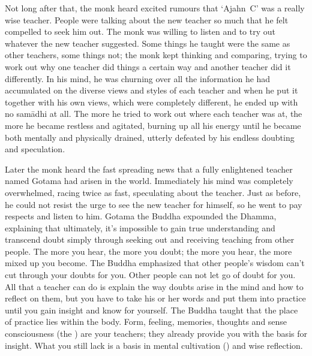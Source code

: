 Not long after that, the monk heard excited rumours that `Ajahn~C' was a really wise teacher. People were talking about the new teacher so much that he felt compelled to seek him out. The monk was willing to listen and to try out whatever the new teacher suggested. Some things he taught were the same as other teachers, some things not; the monk kept thinking and comparing, trying to work out why one teacher did things a certain way and another teacher did it differently. In his mind, he was churning over all the information he had accumulated on the diverse views and styles of each teacher and when he put it together with his own views, which were completely different, he ended up with no sam\=adhi at all. The more he tried to work out where each teacher was at, the more he became restless and agitated, burning up all his energy until he became both mentally and physically drained, utterly defeated by his endless doubting and speculation. 

Later the monk heard the fast spreading news that a fully enlightened teacher named Gotama had arisen in the world. Immediately his mind was completely overwhelmed, racing twice as fast, speculating about the teacher. Just as before, he could not resist the urge to see the new teacher for himself, so he went to pay respects and listen to him. Gotama the Buddha expounded the Dhamma, explaining that ultimately, it's impossible to gain true understanding and transcend doubt simply through seeking out and receiving teaching from other people. The more you hear, the more you doubt; the more you hear, the more mixed up you become. The Buddha emphasized that other people's wisdom can't cut through your doubts for you. Other people can not let go of doubt for you. All that a teacher can do is explain the way doubts arise in the mind and how to reflect on them, but you have to take his or her words and put them into practice until you gain insight and know for yourself. The Buddha taught that the place of practice lies within the body. Form, feeling, memories, thoughts and sense consciousness (the ) are your teachers; they already provide you with the basis for insight. What you still lack is a basis in mental cultivation () and wise reflection. 

